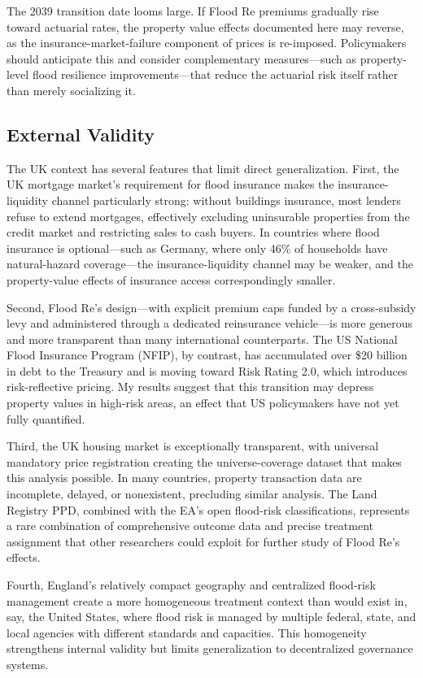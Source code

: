 \documentclass[12pt]{article}
\begin{document}
The 2039 transition date looms large. If Flood Re premiums gradually rise toward actuarial rates, the property value effects documented here may reverse, as the insurance-market-failure component of prices is re-imposed. Policymakers should anticipate this and consider complementary measures---such as property-level flood resilience improvements---that reduce the actuarial risk itself rather than merely socializing it.

\subsection{External Validity}

The UK context has several features that limit direct generalization. First, the UK mortgage market's requirement for flood insurance makes the insurance-liquidity channel particularly strong: without buildings insurance, most lenders refuse to extend mortgages, effectively excluding uninsurable properties from the credit market and restricting sales to cash buyers. In countries where flood insurance is optional---such as Germany, where only 46\% of households have natural-hazard coverage---the insurance-liquidity channel may be weaker, and the property-value effects of insurance access correspondingly smaller.

Second, Flood Re's design---with explicit premium caps funded by a cross-subsidy levy and administered through a dedicated reinsurance vehicle---is more generous and more transparent than many international counterparts. The US National Flood Insurance Program (NFIP), by contrast, has accumulated over \$20 billion in debt to the Treasury and is moving toward Risk Rating 2.0, which introduces risk-reflective pricing. My results suggest that this transition may depress property values in high-risk areas, an effect that US policymakers have not yet fully quantified.

Third, the UK housing market is exceptionally transparent, with universal mandatory price registration creating the universe-coverage dataset that makes this analysis possible. In many countries, property transaction data are incomplete, delayed, or nonexistent, precluding similar analysis. The Land Registry PPD, combined with the EA's open flood-risk classifications, represents a rare combination of comprehensive outcome data and precise treatment assignment that other researchers could exploit for further study of Flood Re's effects.

Fourth, England's relatively compact geography and centralized flood-risk management create a more homogeneous treatment context than would exist in, say, the United States, where flood risk is managed by multiple federal, state, and local agencies with different standards and capacities. This homogeneity strengthens internal validity but limits generalization to decentralized governance systems.
\end{document}
